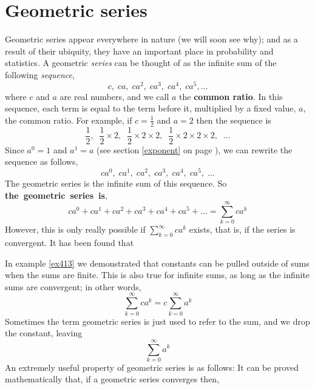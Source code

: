 \section{Geometric series} \label{sec416} \label{geometric series} \label{common ratio}
Geometric series appear everywhere in nature (we will soon see why); and as a result of their ubiquity, they have an important place in probability and statistics. A geometric \textit{series} can be thought of as the infinite sum of the following \textit{sequence},
\[
c,\; ca,\; ca^2,\; ca^3,\; ca^4,\; ca^5, \ldots 
\]
where $c$ and $a$ are real numbers, and we call $a$ the \textbf{common ratio}. In this sequence, each term is equal to the term before it, multiplied by a fixed value, $a$, the common ratio. For example, if $c = \frac{1}{2}$ and $a = 2$ then the sequence is
\[
\frac{1}{2}, \;\; \frac{1}{2}\times2,\;\; \frac{1}{2}\times2\times2,\;\; \frac{1}{2}\times2\times2\times2,\;\; \ldots
\]
Since $a^0 = 1$ and $a^1 = a$ (see section \ref{exponent} on page \pageref{exponent}), we can rewrite the sequence as follows,
\[
ca^0,\; ca^1, \; ca^2,\; ca^3, \; ca^4,\; ca^5, \; \ldots
\]
The geometric series is the infinite sum of this sequence. So \textbf{the~geometric~series~is},
\[
ca^0 + ca^1 + ca^2 + ca^3 + ca^4 + ca^5 + \ldots = \sum_{k=0}^\infty ca^k
\]
However, this is only really possible if $\displaystyle{\sum_{k=0}^\infty ca^k}$ exists, that is, if the series is convergent. It has been found that

  	\bigskip
	
	\hfil{}
	\bigskip
	
\noindent In example \ref{ex413} we demonstrated that constants can be pulled outside of sums when the sums are finite. This is also true for infinite sums, as long as the infinite sums are convergent; in other words,
\[
\sum_{k=0}^\infty ca^k = c\sum_{k=0}^\infty a^k
\]
Sometimes the term geometric series is just used to refer to the sum, and we drop the constant, leaving
\[
\sum_{k=0}^\infty a^k
\]
An extremely useful property of geometric series is as follows: It can be proved mathematically that, if a geometric series converges then,
  	\bigskip
	
	\hfil{}
	\bigskip

